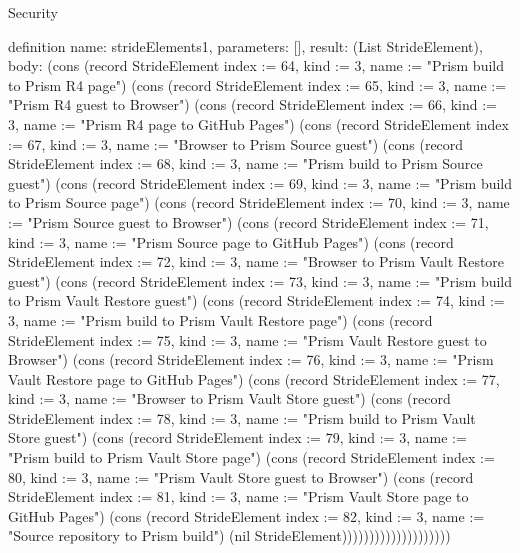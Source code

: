 \begin{lexlean}{Security}
\begin{semanticmodule}
definition{
  name: strideElements1,
  parameters: [],
  result: (List StrideElement),
  body: (cons (record StrideElement {index := 64, kind := 3, name := "Prism build to Prism R4 page"}) (cons (record StrideElement {index := 65, kind := 3, name := "Prism R4 guest to Browser"}) (cons (record StrideElement {index := 66, kind := 3, name := "Prism R4 page to GitHub Pages"}) (cons (record StrideElement {index := 67, kind := 3, name := "Browser to Prism Source guest"}) (cons (record StrideElement {index := 68, kind := 3, name := "Prism build to Prism Source guest"}) (cons (record StrideElement {index := 69, kind := 3, name := "Prism build to Prism Source page"}) (cons (record StrideElement {index := 70, kind := 3, name := "Prism Source guest to Browser"}) (cons (record StrideElement {index := 71, kind := 3, name := "Prism Source page to GitHub Pages"}) (cons (record StrideElement {index := 72, kind := 3, name := "Browser to Prism Vault Restore guest"}) (cons (record StrideElement {index := 73, kind := 3, name := "Prism build to Prism Vault Restore guest"}) (cons (record StrideElement {index := 74, kind := 3, name := "Prism build to Prism Vault Restore page"}) (cons (record StrideElement {index := 75, kind := 3, name := "Prism Vault Restore guest to Browser"}) (cons (record StrideElement {index := 76, kind := 3, name := "Prism Vault Restore page to GitHub Pages"}) (cons (record StrideElement {index := 77, kind := 3, name := "Browser to Prism Vault Store guest"}) (cons (record StrideElement {index := 78, kind := 3, name := "Prism build to Prism Vault Store guest"}) (cons (record StrideElement {index := 79, kind := 3, name := "Prism build to Prism Vault Store page"}) (cons (record StrideElement {index := 80, kind := 3, name := "Prism Vault Store guest to Browser"}) (cons (record StrideElement {index := 81, kind := 3, name := "Prism Vault Store page to GitHub Pages"}) (cons (record StrideElement {index := 82, kind := 3, name := "Source repository to Prism build"}) (nil StrideElement))))))))))))))))))))
}


\end{semanticmodule}
\end{lexlean}
